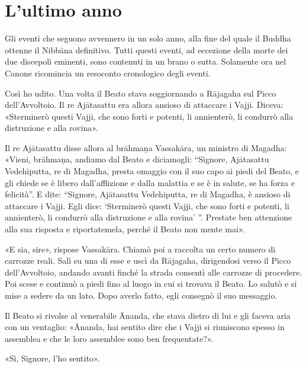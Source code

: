 \chapter{L'ultimo anno}

 Gli eventi che seguono avvennero in un solo anno, alla
fine del quale il Buddha ottenne il Nibbāna definitivo. Tutti questi
eventi, ad eccezione della morte dei due discepoli eminenti, sono
contenuti in un brano o sutta. Solamente ora nel Canone ricomincia un
resoconto cronologico degli eventi.


 Così ho udito. Una volta il Beato stava soggiornando a
Rājagaha sul Picco dell’Avvoltoio. Il re Ajātasattu era allora ansioso
di attaccare i Vajji. Diceva: «Sterminerò questi Vajji, che sono forti e
potenti, li annienterò, li condurrò alla distruzione e alla rovina».


Il re Ajātasattu disse allora al brāhmaṇa Vassakāra, un ministro di
Magadha: «Vieni, brāhmaṇa, andiamo dal Beato e diciamogli: “Signore,
Ajātasattu Vedehiputta, re di Magadha, presta omaggio con il suo capo ai
piedi del Beato, e gli chiede se è libero dall’afflizione e dalla
malattia e se è in salute, se ha forza e felicità”. E dite: “Signore,
Ajātasattu Vedehiputta, re di Magadha, è ansioso di attaccare i Vajji.
Egli dice: ‘Sterminerò questi Vajji, che sono forti e potenti, li
annienterò, li condurrò alla distruzione e alla rovina’ ”. Prestate ben
attenzione alla sua risposta e riportatemela, perché il Beato non mente
mai».


«E sia, sire», rispose Vassakāra. Chiamò poi a raccolta un certo numero
di carrozze reali. Salì su una di esse e uscì da Rājagaha, dirigendosi
verso il Picco dell’Avvoltoio, andando avanti finché la strada consentì
alle carrozze di procedere. Poi scese e continuò a piedi fino al luogo
in cui si trovava il Beato. Lo salutò e si mise a sedere da un lato.
Dopo averlo fatto, egli consegnò il suo messaggio.


Il Beato si rivolse al venerabile Ānanda, che stava dietro di lui e gli
faceva aria con un ventaglio: «Ānanda, hai sentito dire che i Vajji si
riuniscono spesso in assemblea e che le loro assemblee sono ben
frequentate?».


«Sì, Signore, l’ho sentito».


